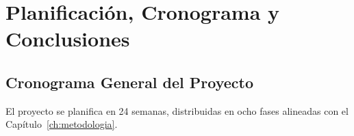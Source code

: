 \chapter{Planificación, Cronograma y Conclusiones}
\label{ch:cronograma}

\section{Cronograma General del Proyecto}

El proyecto se planifica en 24 semanas, distribuidas en ocho fases alineadas con
el Capítulo~\ref{ch:metodologia}.

